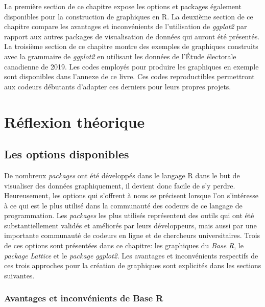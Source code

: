 \documentclass[
  letterpaper,
]{scrbook}
\begin{document}
La première section de ce chapitre expose les options et packages
également disponibles pour la construction de graphiques en R. La
deuxième section de ce chapitre compare les avantages et inconvénients
de l'utilisation de \emph{ggplot2} par rapport aux autres packages de
visualisation de données qui auront été présentés. La troisième section
de ce chapitre montre des exemples de graphiques construits avec la
grammaire de \emph{ggplot2} en utilisant les données de l'Étude
électorale canadienne de 2019. Les codes employés pour produire les
graphiques en exemple sont disponibles dans l'annexe de ce livre. Ces
codes reproductibles permettront aux codeurs débutants d'adapter ces
derniers pour leurs propres projets.

\hypertarget{ruxe9flexion-thuxe9orique}{%
\section{Réflexion théorique}\label{ruxe9flexion-thuxe9orique}}

\hypertarget{les-options-disponibles}{%
\subsection{Les options disponibles}\label{les-options-disponibles}}

De nombreux \emph{packages} ont été développés dans le langage R dans le
but de visualiser des données graphiquement, il devient donc facile de
s'y perdre. Heureusement, les options qui s'offrent à nous se précisent
lorsque l'on s'intéresse à ce qui est le plus utilisé dans la communauté
des codeurs de ce langage de programmation. Les \emph{packages} les plus
utilisés représentent des outils qui ont été substantiellement validés
et améliorés par leurs développeurs, mais aussi par une importante
communauté de codeurs en ligne et de chercheurs universitaires. Trois de
ces options sont présentées dans ce chapitre: les graphiques du
\emph{Base R}, le \emph{package} \emph{Lattice} et le \emph{package}
\emph{ggplot2}. Les avantages et inconvénients respectifs de ces trois
approches pour la création de graphiques sont explicités dans les
sections suivantes.

\hypertarget{avantages-et-inconvuxe9nients-de-base-r}{%
\subsubsection{Avantages et inconvénients de Base
R}\label{avantages-et-inconvuxe9nients-de-base-r}}
\end{document}
